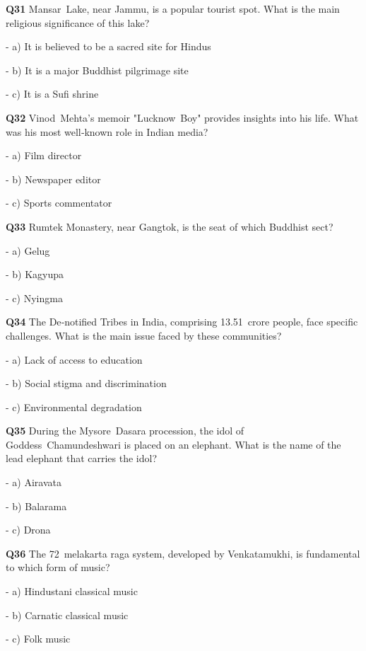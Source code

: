 \textbf{Q31} Mansar Lake, near Jammu, is a popular tourist spot. What is the main religious significance of this lake?\par
\quad - a) It is believed to be a sacred site for Hindus\par
\quad - b) It is a major Buddhist pilgrimage site\par
\quad - c) It is a Sufi shrine\par

\textbf{Q32} Vinod Mehta's memoir "Lucknow Boy" provides insights into his life. What was his most well‑known role in Indian media?\par
\quad - a) Film director\par
\quad - b) Newspaper editor\par
\quad - c) Sports commentator\par

\textbf{Q33} Rumtek Monastery, near Gangtok, is the seat of which Buddhist sect?\par
\quad - a) Gelug\par
\quad - b) Kagyupa\par
\quad - c) Nyingma\par

\textbf{Q34} The De‑notified Tribes in India, comprising 13.51 crore people, face specific challenges. What is the main issue faced by these communities?\par
\quad - a) Lack of access to education\par
\quad - b) Social stigma and discrimination\par
\quad - c) Environmental degradation\par

\textbf{Q35} During the Mysore Dasara procession, the idol of Goddess Chamundeshwari is placed on an elephant. What is the name of the lead elephant that carries the idol?\par
\quad - a) Airavata\par
\quad - b) Balarama\par
\quad - c) Drona\par

\textbf{Q36} The 72 melakarta raga system, developed by Venkatamukhi, is fundamental to which form of music?\par
\quad - a) Hindustani classical music\par
\quad - b) Carnatic classical music\par
\quad - c) Folk music\par

